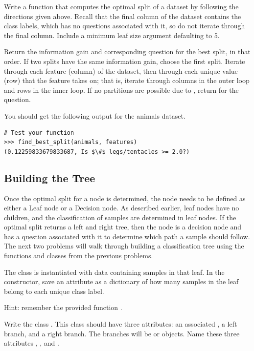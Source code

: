 \begin{problem}
Write a function  that computes the optimal split of a dataset by following the directions given above.
Recall that the final column of the dataset contains the class labels, which has no questions associated with it, so do not iterate through the final column.
Include a minimum leaf size argument  defaulting to 5.

Return the information gain and corresponding question for the best split, in that order.
If two splits have the same information gain, choose the first split.
Iterate through each feature (column) of the dataset, then through each unique value (row) that the feature takes on; that is, iterate through columns in the outer loop and rows in the inner loop.
If no partitions are possible due to , return  for the question.

\noindent You should get the following output for the animals dataset.
\begin{lstlisting}[mathescape=true]
# Test your function
>>> find_best_split(animals, features)
(0.12259833679833687, Is $\#$ legs/tentacles >= 2.0?)
\end{lstlisting}
\end{problem}

\subsection*{Building the Tree}
Once the optimal split for a node is determined, the node needs to be defined as either a Leaf node or a Decision node.
As described earlier, leaf nodes have no children, and the classification of samples are determined in leaf nodes.
If the optimal split returns a left and right tree, then the node is a decision node and has a question associated with it to determine which path a sample should follow.
The next two problems will walk through building a classification tree using the functions and classes from the previous problems.

\begin{problem}
The class  is instantiated with data containing samples in that leaf.
In the constructor, save an attribute  as a dictionary of how many samples in the leaf belong to each unique class label.

\noindent Hint: remember the provided function .

Write the class .
This class should have three attributes: an associated , a left branch, and a right branch.
The branches will be  or  objects.
Name these three attributes , , and .
\end{problem}

